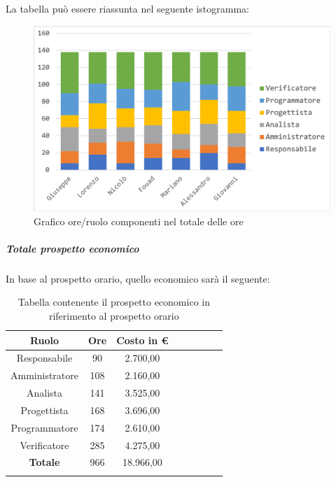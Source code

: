 			La tabella può essere riassunta nel seguente istogramma:
			\begin{figure}[H]
				\centering
				\includegraphics[width=0.8\linewidth]{./images/preventivo/totOre1.png}
				\caption{Grafico ore/ruolo componenti nel totale delle ore}
				\label{fig:grafico suddivione ruoli totale ore}
			\end{figure}
			
			\subparagraph{Totale prospetto economico}
			In base al prospetto orario, quello economico sarà il seguente: 
			
			\begin{longtable}{|c|c|c|c|c|c|c|c|}
				\hline
				\rowcolor{lighter-grayer}
				\textbf{Ruolo} & \textbf{Ore} & \textbf{Costo in € } \\
				\hline
				\endfirsthead
				
				\hline
				Responsabile 	    & 90 & 2.700,00\\
				\hline 
				\hline
				Amministratore	  & 108 & 2.160,00\\
				\hline
				\hline
				Analista 				& 141 & 3.525,00\\
				\hline
				\hline
				Progettista 		  & 168 & 3.696,00\\
				\hline
				\hline
				Programmatore 	 & 174 & 2.610,00\\
				\hline
				\hline
				Verificatore 		  & 285 & 4.275,00\\
				\hline
				\textbf{Totale} 	& 966 & 18.966,00\\
				\hline
				\caption{Tabella contenente il prospetto economico in riferimento al prospetto orario}
			\end{longtable}
			\pagebreak
			
